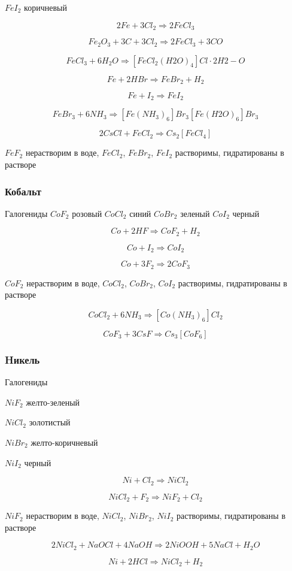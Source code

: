 \documentclass[11pt]{article}
\begin{document}
$FeI_2$ коричневый

$$2Fe + 3Cl_2 \Rightarrow 2FeCl_3$$

$$Fe_2O_3 + 3C + 3Cl_2 \Rightarrow 2FeCl_3 + 3CO$$

$$FeCl_3 + 6H_2O \Rightarrow [FeCl_2(H2O)_4]Cl·2H2-O$$

$$Fe + 2HBr \Rightarrow FeBr_2 + H_2$$

$$Fe + I_2 \Rightarrow FeI_2$$

$$FeBr_3 + 6NH_3 \Rightarrow [Fe(NH_3)_6]Br_3 [Fe(H2O)_6]Br_3$$

$$2CsCl + FeCl_2 \Rightarrow Cs_2[FeCl_4]$$

$FeF_2$ нерастворим в воде, $FeCl_2$, $FeBr_2$, $FeI_2$ растворимы, гидратированы в растворе


\subsubsection{ Кобальт}
Галогениды
$CoF_2$ розовый
$CoCl_2$ синий
$CoBr_2$ зеленый
$CoI_2$ черный

$$Co + 2HF \Rightarrow CoF_2 + H_2$$

$$Co + I_2 \Rightarrow CoI_2$$

$$Co + 3F_2 \Rightarrow 2CoF_3$$

$CoF_2$ нерастворим в воде, $CoCl_2$, $CoBr_2$, $CoI_2$ растворимы, гидратированы в растворе

$$CoCl_2 + 6NH_3 \Rightarrow [Co(NH_3)_6]Cl_2$$

$$CoF_3 + 3CsF \Rightarrow Cs_3[CoF_6]$$

\subsubsection{Hикель}

Галогениды

$NiF_2$ желто-зеленый

$NiCl_2$ золотистый

$NiBr_2$ желто-коричневый

$NiI_2$ черный

$$Ni + Cl_2 \Rightarrow NiCl_2$$

$$NiCl_2 + F_2 \Rightarrow NiF_2 + Cl_2$$

$NiF_2$ нерастворим в воде, $NiCl_2$, $NiBr_2$, $NiI_2$ растворимы, гидратированы в растворе

$$2NiCl_2 + NaOCl + 4NaOH \Rightarrow 2NiOOH + 5NaCl + H_2O$$

$$Ni + 2HCl \Rightarrow NiCl _2 + H _2$$
\end{document}
